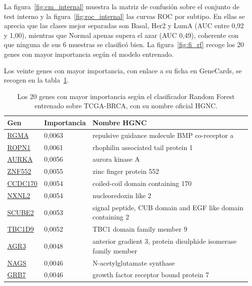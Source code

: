 \documentclass[12pt, a4paper]{report}
\begin{document}
La figura~\ref{fig:cm_internal} muestra la matriz de confusión sobre el conjunto de test interno y la figura~\ref{fig:roc_internal} las curvas ROC por subtipo. En ellas se aprecia que las clases mejor separadas son Basal, Her2 y LumA (AUC entre 0,92 y 1,00), mientras que Normal apenas supera el azar (AUC 0,49), coherente con que ninguna de sus 6 muestras se clasificó bien. La figura~\ref{fig:fi_rf} recoge los 20 genes con mayor importancia según el modelo entrenado.

Los veinte genes con mayor importancia, con enlace a su ficha en GeneCards, se recogen en la tabla~\ref{tab:top_genes}.

\begin{table}[htbp]
\caption{Los 20 genes con mayor importancia según el clasificador Random Forest entrenado sobre TCGA-BRCA, con su nombre oficial HGNC.}
\label{tab:top_genes}
\centering
\begin{tabular}{lll}
\toprule
\textbf{Gen} & \textbf{Importancia} & \textbf{Nombre HGNC} \\
\midrule
\href{https://www.genecards.org/card/RGMA}{RGMA} & 0{,}0063 & repulsive guidance molecule BMP co-receptor a \\
\href{https://www.genecards.org/card/ROPN1}{ROPN1} & 0{,}0061 & rhophilin associated tail protein 1 \\
\href{https://www.genecards.org/card/AURKA}{AURKA} & 0{,}0056 & aurora kinase A \\
\href{https://www.genecards.org/card/ZNF552}{ZNF552} & 0{,}0055 & zinc finger protein 552 \\
\href{https://www.genecards.org/card/CCDC170}{CCDC170} & 0{,}0054 & coiled-coil domain containing 170 \\
\href{https://www.genecards.org/card/NXNL2}{NXNL2} & 0{,}0054 & nucleoredoxin like 2 \\
\href{https://www.genecards.org/card/SCUBE2}{SCUBE2} & 0{,}0053 & signal peptide, CUB domain and EGF like domain containing 2 \\
\href{https://www.genecards.org/card/TBC1D9}{TBC1D9} & 0{,}0052 & TBC1 domain family member 9 \\
\href{https://www.genecards.org/card/AGR3}{AGR3} & 0{,}0048 & anterior gradient 3, protein disulphide isomerase family member \\
\href{https://www.genecards.org/card/NAGS}{NAGS} & 0{,}0046 & N-acetylglutamate synthase \\
\href{https://www.genecards.org/card/GRB7}{GRB7} & 0{,}0046 & growth factor receptor bound protein 7 \\

\end{tabular}
\end{table}
\end{document}
